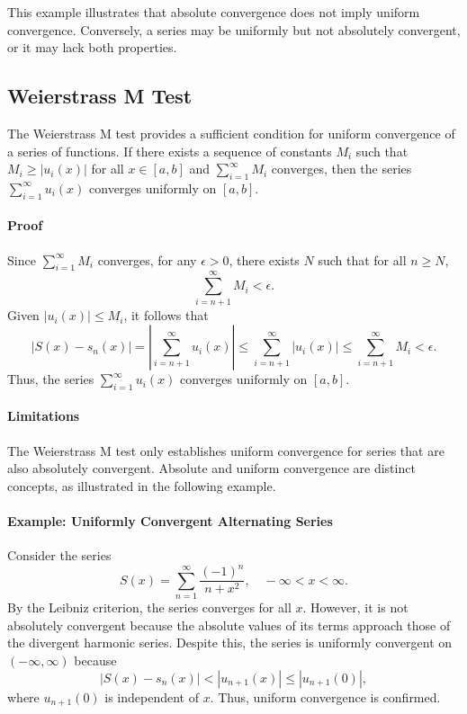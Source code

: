 \documentclass[12pt]{article}
\begin{document}
This example illustrates that absolute convergence does not imply uniform convergence. Conversely, a series may be uniformly but not absolutely convergent, or it may lack both properties.

\subsection{Weierstrass M Test}
The Weierstrass M test provides a sufficient condition for uniform convergence of a series of functions. If there exists a sequence of constants \(M_i\) such that \(M_i \geq |u_i(x)|\) for all \(x \in [a, b]\) and \(\sum_{i=1}^\infty M_i\) converges, then the series \(\sum_{i=1}^\infty u_i(x)\) converges uniformly on \([a, b]\).

\paragraph{Proof}
Since \(\sum_{i=1}^\infty M_i\) converges, for any \(\epsilon > 0\), there exists \(N\) such that for all \(n \geq N\),
\[
\sum_{i=n+1}^\infty M_i < \epsilon.
\]
Given \(|u_i(x)| \leq M_i\), it follows that
\[
\left| S(x) - s_n(x) \right| = \left| \sum_{i=n+1}^\infty u_i(x) \right| \leq \sum_{i=n+1}^\infty |u_i(x)| \leq \sum_{i=n+1}^\infty M_i < \epsilon.
\]
Thus, the series \(\sum_{i=1}^\infty u_i(x)\) converges uniformly on \([a, b]\).

\paragraph{Limitations}
The Weierstrass M test only establishes uniform convergence for series that are also absolutely convergent. Absolute and uniform convergence are distinct concepts, as illustrated in the following example.

\paragraph{Example: Uniformly Convergent Alternating Series}
Consider the series
\[
S(x) = \sum_{n=1}^\infty \frac{(-1)^n}{n + x^2}, \quad -\infty < x < \infty.
\]
By the Leibniz criterion, the series converges for all \(x\). However, it is not absolutely convergent because the absolute values of its terms approach those of the divergent harmonic series. Despite this, the series is uniformly convergent on \((-\infty, \infty)\) because
\[
|S(x) - s_n(x)| < |u_{n+1}(x)| \leq |u_{n+1}(0)|,
\]
where \(u_{n+1}(0)\) is independent of \(x\). Thus, uniform convergence is confirmed.
\end{document}
